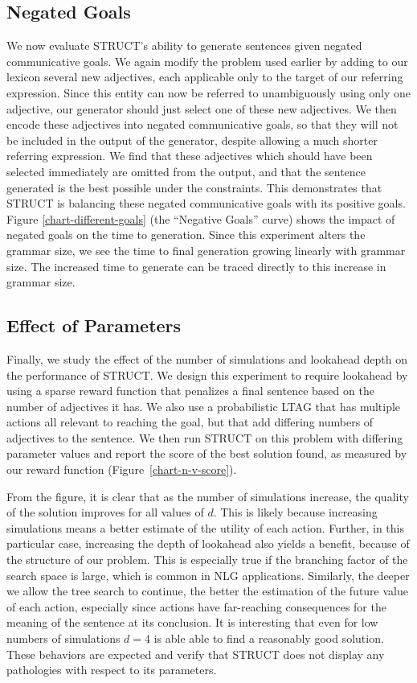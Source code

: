 \subsection{Negated Goals}
We now evaluate STRUCT's ability to generate
sentences given negated communicative goals.  We again modify
the problem used earlier by 
adding to our lexicon several new adjectives, each applicable only to
the target of our referring expression.  Since this entity can now be
referred to unambiguously using only one adjective, our generator
should just select one of these new adjectives.  We then encode these
adjectives into negated communicative goals, so that they will not be
included in the output of the generator, despite allowing a much
shorter referring expression.  We find that these adjectives which
should have been selected immediately are omitted from the output, and
that the sentence generated is the best possible under the
constraints.  This demonstrates that STRUCT is balancing these negated
communicative goals with its positive goals.  Figure
\ref{chart-different-goals} (the ``Negative Goals'' curve) shows the
impact of negated goals on the time to generation.  Since this
experiment alters the grammar size, we see the time to final
generation growing linearly with grammar size.  The increased time to
generate can be traced directly to this increase in grammar size.

\subsection{Effect of Parameters}
Finally, we study the effect of the number of simulations and
lookahead depth on the performance of STRUCT. We design this
experiment to require lookahead by using  a sparse
reward function that penalizes a final sentence based on the number of
adjectives it has. We also use a probabilistic LTAG that has multiple
actions all relevant to reaching the goal, but that add differing
numbers of adjectives to the sentence. We then run STRUCT on this
problem with differing parameter values and report the score of the
best solution found, as measured by our reward function
(Figure~\ref{chart-n-v-score}). 

From the figure, it is clear that as the number of simulations
increase, the quality of the solution improves for all values of $d$.
This is likely because increasing simulations means a better estimate
of the utility of each action. Further, in this particular case,
increasing the depth of lookahead also yields a benefit, because of
the structure of our problem. This is especially true if the branching
factor of the search space is large, which is common in NLG
applications.  Similarly, the deeper we allow the tree search to continue, the
better the estimation of the future value of each action,
especially since actions have far-reaching consequences for the
meaning of the sentence at its conclusion. 
It is interesting that even for low numbers of
simulations $d=4$ is able able to find a reasonably good
solution. These behaviors are expected and verify 
that STRUCT does not display any pathologies with respect to its parameters.